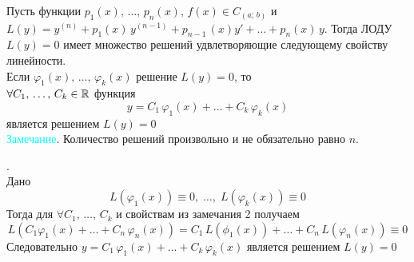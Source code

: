 \begin{Th}
    Пусть функции $p_1(x),\, \dots,\, p_n(x),\, f(x) \in C_{(a;\,b)}$ и $L(y)=y^{(n)}+p_1(x)\,y^{(n-1)}+p_{n-1}\,(x)y'+ \dots + p_n(x)\,y$.
    Тогда ЛОДУ $L(y) = 0$ имеет множество решений удвлетворяющие следующему свойству линейности.\\
    Если $\varphi_1(x),\, \dots,\, \varphi_k(x)$ решение $L(y)=0$, то\\
    $\forall C_1,\, \dots,\, C_k \in \mathbb{R}$ функция 
    \[
        y = C_1\,\varphi_1(x) + \dots + C_k\,\varphi_k(x)  
    \]
    является решением $L(y)=0$\\
    
    \textcolor{cyan}{Замечание}. Количество решений произвольно и не обязательно равно $n$.
\end{Th}

\begin{Proof}.\\
    Дано 
    \[
        L(\varphi_1(x))\equiv 0,\; \dots,\; L(\varphi_k(x))\equiv 0
    \]
    Тогда для $\forall C_1,\, \dots,\, C_k$ и свойствам из замечания 2 получаем
    \[
        L(C_1\varphi_1(x) + \dots + C_n\,\varphi_n(x)) = C_1\,L(\phi_1(x)) + \dots + C_n\,L(\varphi_n(x))\equiv 0
    \]
    Следовательно $y=C_1\,\varphi_1(x)+ \dots + C_k\,\varphi_k(x)$ является решением $L(y)=0$
    
\end{Proof}
